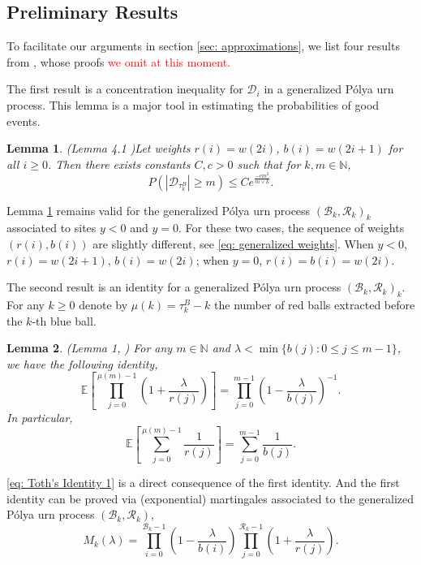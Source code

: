 \documentclass[twoside,12pt,a4paper]{article}
\newtheorem{lemma}{Lemma}[section]
\numberwithin{equation}{section}
\newcommand{\abs}[1]{\left\vert #1 \right\vert}
\begin{document}
		\subsection{Preliminary Results}
		To facilitate our arguments in section \ref{sec: approximations}, we list four results from \cite{KMP22,T96}, whose proofs \textcolor{red}{we omit at this moment.}
		
		The first result is a concentration inequality for $\mathcal{D}_i$ in a generalized P\'{o}lya urn process. This lemma is a major tool in estimating the probabilities of good events.
		\begin{lemma}(Lemma 4.1 \cite{KMP22})\label{lm: concentration inequality}
			Let weights $r(i) = w(2i)$, $b(i)= w(2i+1) $ for all $i\geq 0$. Then there exists constants $C,c>0$ such that for $k, m \in \mathbb{N}$,
			$$
			P\left(  \abs{ \mathcal{D}_{\tau_k^B}   } \geq m \right) \leq C e^{\frac{-cm^2}{m \vee k}}.
			$$
		\end{lemma} 
		Lemma \ref{lm: concentration inequality} remains valid for the generalized P\'{o}lya urn process $(\mathcal{B}_{k},\mathcal{R}_{k})_k$ associated to sites $y<0$ and $y=0$. For these two cases, the sequence of weights $(r(i),b(i))$ are slightly different, see \eqref{eq: generalized weights}. When $y<0$, $r(i) = w(2i+1)$, $b(i)= w(2i) $; when $y=0$, $r(i) = b(i)=w(2i)$.
		
		The second result is an identity for a generalized P\'{o}lya urn process $(\mathcal{B}_{k},\mathcal{R}_{k})_k$. For any $k\geq 0$ denote by $\mu(k)= \tau^B_k - k$ the number of red balls extracted before the $k$-th blue ball. 
		\begin{lemma}(Lemma 1, \cite{T96}) \label{lm: Toth's Identity}
			For any $m\in \mathbb{N}$ and $\lambda < \min\{ b(j): 0\leq j\leq m-1 \}$, we have the following identity,
			$$  \mathbb{E}\left[  \prod_{j=0}^{ \mu(m)-1 } \left(1+ \frac{\lambda}{r(j)}   \right) \right] =   \prod_{j=0}^{ m-1 } \left(1- \frac{\lambda}{b(j)}   \right)^{-1}.   $$ 
			In particular, 
			\begin{equation}\label{eq: Toth's Identity 1}
				\mathbb{E}\left[  \sum_{j=0}^{ \mu(m)-1 } \frac{1}{r(j)}   \right] =   \sum_{j=0}^{ m-1 } \frac{1}{b(j)}.
			\end{equation}	
		\end{lemma}
		\eqref{eq: Toth's Identity 1} is a direct consequence of the first identity. And the first identity can be proved via (exponential) martingales associated to the generalized P\'{o}lya urn process $(\mathcal{B}_{k},\mathcal{R}_{k})$, 
		$$M_k(\lambda) = \prod_{i=0}^{ \mathcal{B}_{k}-1 } \left(1-\frac{\lambda}{b(i)}\right) \prod_{j=0}^{\mathcal{R}_{k}-1 } \left(1+\frac{\lambda}{r(j)}\right). $$
		
\end{document}
